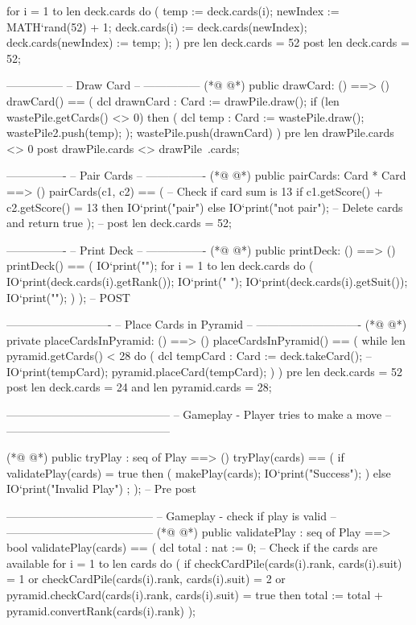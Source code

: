 \begin{vdmpp}[breaklines=true]
     for i = 1 to len deck.cards do 
     (
      temp := deck.cards(i);
      newIndex := MATH`rand(52) + 1;
      deck.cards(i) := deck.cards(newIndex);
      deck.cards(newIndex) := temp;
     );
 )
 pre len deck.cards = 52
 post len deck.cards = 52;
 
 ---------------
 -- Draw Card --
 ---------------
(*@
\label{drawCard:120}
@*)
 public drawCard: () ==> ()
  drawCard() ==
  (
   dcl drawnCard : Card := drawPile.draw();
   if (len wastePile.getCards() <> 0) then (
    dcl temp : Card := wastePile.draw();
    wastePile2.push(temp);
   );
    wastePile.push(drawnCard)
  )
 pre len drawPile.cards <> 0
 post drawPile.cards <> drawPile~.cards;
 
 
 ----------------
 -- Pair Cards --
 ----------------
(*@
\label{pairCards:137}
@*)
 public pairCards: Card * Card ==> ()
 pairCards(c1, c2) == 
 ( 
  -- Check if card sum is 13
  if c1.getScore() + c2.getScore() = 13 
   then  IO`print("pair\n")
  else IO`print("not pair\n");
  -- Delete cards and return true
  );
 -- post len deck.cards  = 52;
  
  ----------------
  -- Print Deck --
  ----------------
(*@
\label{printDeck:151}
@*)
  public printDeck: () ==> ()
  printDeck() == 
  ( 
    IO`print("\n");
   for i = 1 to len deck.cards do
   (
     IO`print(deck.cards(i).getRank());
     IO`print(" ");
     IO`print(deck.cards(i).getSuit());
     IO`print("\n");
   )
  );
  -- POST 
  
  ----------------------------
  -- Place Cards in Pyramid --
  ----------------------------
(*@
\label{placeCardsInPyramid:168}
@*)
  private placeCardsInPyramid: () ==> ()
   placeCardsInPyramid() == 
   (    
     while len pyramid.getCards() < 28 do 
     (
      dcl tempCard : Card := deck.takeCard();
      --IO`print(tempCard);
      pyramid.placeCard(tempCard);
     )
   )
  pre len deck.cards = 52
  post len deck.cards = 24 and len pyramid.cards = 28;
 
  
  --------------------------------------------
  -- Gameplay - Player tries to make a move --
  --------------------------------------------

(*@
\label{tryPlay:186}
@*)
   public tryPlay : seq of Play ==> ()
   tryPlay(cards) ==
   (
     if validatePlay(cards) = true then 
     (
      makePlay(cards);
      IO`print("Success");
     )
     else IO`print("Invalid Play")  ;
   );
  -- Pre post
  
  ---------------------------------------
  -- Gameplay - check if play is valid --
  ---------------------------------------
(*@
\label{validatePlay:201}
@*)
  public validatePlay : seq of Play ==> bool
  validatePlay(cards) ==
  (
   dcl total : nat := 0;
   -- Check if the cards are available
   for i = 1 to len cards do 
   (
    if checkCardPile(cards(i).rank, cards(i).suit) = 1 or
     checkCardPile(cards(i).rank, cards(i).suit) = 2
    or pyramid.checkCard(cards(i).rank, cards(i).suit) = true 
    then total := total + pyramid.convertRank(cards(i).rank)
   );
   

\end{vdmpp}
